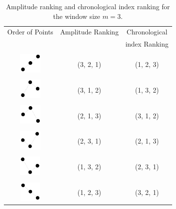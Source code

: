 \documentclass[%
 aip,
 amsmath,amssymb,
 reprint,%
]{revtex4-1}
\begin{document}
\begin{table}    %
\caption{\label{tab:Ranking}Amplitude ranking and chronological index ranking
for the window size $m=3$.}
\begin{ruledtabular}
\begin{tabular}{ccc}
Order of Points&Amplitude Ranking&Chronological\\
&&index Ranking\\
\hline
\\
\includegraphics[width=12mm, height=10mm]{1.JPG} & (3, 2, 1) & (1, 2, 3)\\
\\
\includegraphics[width=12mm, height=10mm]{2.JPG} & (3, 1, 2) & (1, 3, 2)\\
\\
\includegraphics[width=12mm, height=10mm]{3.JPG} & (2, 1, 3) & (3, 1, 2)\\
\\
\includegraphics[width=12mm, height=10mm]{4.JPG} & (2, 3, 1) & (2, 1, 3)\\
\\
\includegraphics[width=12mm, height=10mm]{5.JPG} & (1, 3, 2) & (2, 3, 1)\\
\\
\includegraphics[width=12mm, height=10mm]{6.JPG} & (1, 2, 3) & (3, 2, 1)\\
\end{tabular}
\end{ruledtabular}
\end{table}
\end{document}
